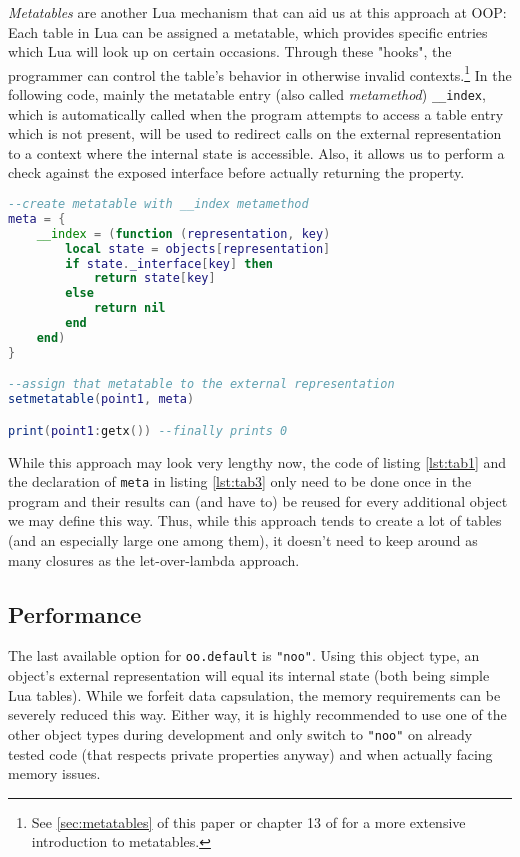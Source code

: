 \emph{Metatables} are another Lua mechanism that can aid us at this approach at OOP: Each table in Lua can be assigned a metatable, which provides specific entries which Lua will look up on certain occasions. Through these "hooks", the programmer can control the table's behavior in otherwise invalid contexts.\footnote{See \ref{sec:metatables} of this paper or chapter 13 of \cite{Ierusalimschy2006} for a more extensive introduction to metatables.} In the following code, mainly the metatable entry (also called \emph{metamethod}) \texttt{\_\_index}, which is automatically called when the program attempts to access a table entry which is not present, will be used to redirect calls on the external representation to a context where the internal state is accessible. Also, it allows us to perform a check against the exposed interface before actually returning the property.

\begin{lstlisting}[language=lua, caption={Accessing the public methods of the internal state directly through the external representation (continued from listing \ref{lst:tab2})}, label=lst:tab3, name=lst:tab]
--create metatable with __index metamethod
meta = {
	__index = (function (representation, key)
		local state = objects[representation]
		if state._interface[key] then
			return state[key]
		else
			return nil
		end
	end)
}

--assign that metatable to the external representation
setmetatable(point1, meta)

print(point1:getx()) --finally prints 0
\end{lstlisting}

While this approach may look very lengthy now, the code of listing \ref{lst:tab1} and the declaration of \texttt{meta} in listing \ref{lst:tab3} only need to be done once in the program and their results can (and have to) be reused for every additional object we may define this way. Thus, while this approach tends to create a lot of tables (and an especially large one among them), it doesn't need to keep around as many closures as the let-over-lambda approach.

\subsection{Performance}
\label{sec:oo:performance}

The last available option for \texttt{oo.default} is \texttt{"noo"}. Using this object type, an object's external representation will equal its internal state (both being simple Lua tables). While we forfeit data capsulation, the memory requirements can be severely reduced this way. Either way, it is highly recommended to use one of the other object types during development and only switch to \texttt{"noo"} on already tested code (that respects private properties anyway) and when actually facing memory issues. 

